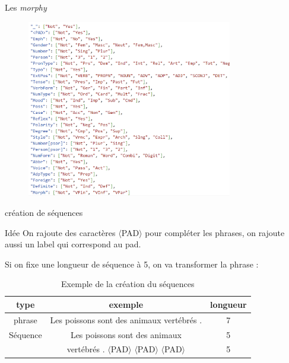 \documentclass[11pt]{beamer}
\begin{document}
\begin{frame}{Les \textit{morphy}}
    \begin{figure}
        \centering
        \includegraphics[width=0.8\textwidth]{all_morphy.png}
    \end{figure}
\end{frame}

\begin{frame}{création de séquences}
    \begin{exampleblock}{Idée}
        On rajoute des caractères $\langle$PAD$\rangle$ pour compléter les phrases,
        on rajoute aussi un label qui correspond au pad.
    \end{exampleblock}

    \bigskip
    Si on fixe une longueur de séquence à 5, on va transformer la phrase :
    \begin{table}
        \centering
        \begin{tabular}{|c|c|c|}
            \hline
            \textbf{type} & \textbf{exemple} & \textbf{longueur} \\
            \hline
            phrase & Les poissons sont des animaux vertébrés . & 7 \\
            \hline
            Séquence & Les poissons sont des animaux & 5\\
             & vertébrés . $\langle$PAD$\rangle$ $\langle$PAD$\rangle$ $\langle$PAD$\rangle$ & 5\\
            \hline
        \end{tabular}
        \caption{Exemple de la création du séquences}
    \end{table}
\end{frame}
\end{document}
